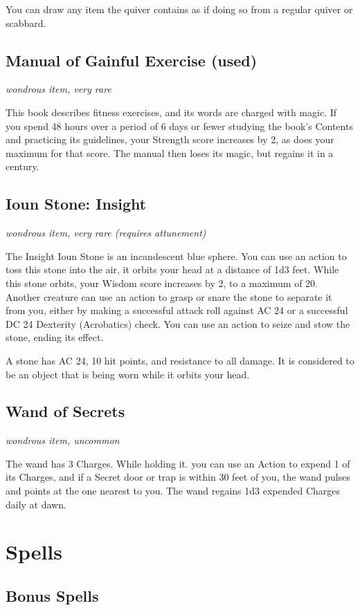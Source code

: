 \documentclass[letterpaper,openany,oneside,twocolumn]{book}
\begin{document}
You can draw any item the quiver contains as if doing so from a regular quiver or scabbard.

\subsection*{Manual of Gainful Exercise (used)}
\textit{wondrous item, very rare}

This book describes fitness exercises, and its words are charged with magic. If you spend 48 hours over a period of 6 days or fewer studying the book's Contents and practicing its guidelines, your Strength score increases by 2, as does your maximum for that score. The manual then loses its magic, but regains it in a century.

\subsection*{Ioun Stone: Insight}
\textit{wondrous item, very rare (requires attunement)}

The Insight Ioun Stone is an incandescent blue sphere. You can use an action to toss this stone into the air, it orbits your head at a distance of 1d3 feet. While this stone orbits, your Wisdom score increases by 2, to a maximum of 20. Another creature can use an action to grasp or snare the stone to separate it from you, either by making a successful attack roll against AC 24 or a successful DC 24 Dexterity (Acrobatics) check. You can use an action to seize and stow the stone, ending its effect.

A stone has AC 24, 10 hit points, and resistance to all damage. It is considered to be an object that is being worn while it orbits your head.

\subsection*{Wand of Secrets}
\textit{wondrous item, uncommon}

The wand has 3 Charges. While holding it. you can use an Action to expend 1 of its Charges, and if a Secret door or trap is within 30 feet of you, the wand pulses and points at the one nearest to you. The wand regains 1d3 expended Charges daily at dawn.

\section*{Spells}

\subsection*{Bonus Spells}
\end{document}
